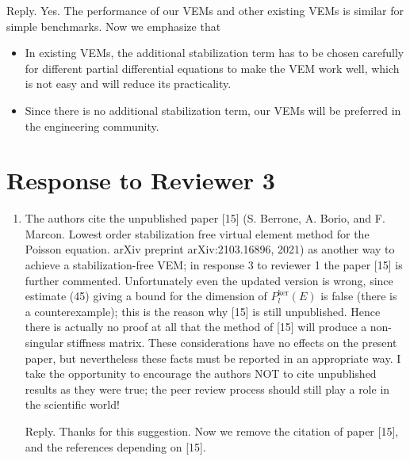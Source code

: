 \documentclass[10pt]{amsart}
\theoremstyle{definition}
\theoremstyle{remark}
\begin{document}
\begin{enumerate}[1.]
\smallskip \noindent \textcolor[rgb]{1.00,0.00,0.00}{Reply.}
Yes. The performance of our VEMs and other existing VEMs is similar for simple benchmarks.
Now we emphasize that
\begin{itemize}
\item
In existing VEMs, the additional stabilization term has to be chosen carefully for different partial differential equations to make the VEM work well, which is not easy and will reduce its practicality.
\item 
Since there is no additional stabilization term, our VEMs will be preferred in the engineering community. 
\end{itemize}


\end{enumerate}




\section{Response to Reviewer 3}

\begin{enumerate}[1.]
\item \textsf{The authors cite the unpublished paper [15] (S. Berrone, A. Borio, and F. Marcon. Lowest order stabilization free virtual element method for the Poisson equation. arXiv preprint arXiv:2103.16896, 2021) as another way to achieve a stabilization-free VEM; in response 3 to reviewer 1 the paper [15] is further commented. Unfortunately even the updated version is wrong, since estimate (45) giving a bound for the dimension of $P_l^\text{ker}(E)$ is false (there is a counterexample); this is the reason why [15] is still unpublished. Hence there is actually no proof at all that the method of [15] will produce a non-singular stiffness matrix. These considerations have no effects on the present paper, but nevertheless these facts must be reported in an appropriate way. \vskip0.1cm
\noindent 
I take the opportunity to encourage the authors NOT to cite unpublished results as they were true; the peer review process should still play a role in the scientific world!}

\smallskip \noindent \textcolor[rgb]{1.00,0.00,0.00}{Reply.}
Thanks for this suggestion. Now we remove the citation of paper [15], and the references depending on [15].



\end{enumerate}





\end{document}
